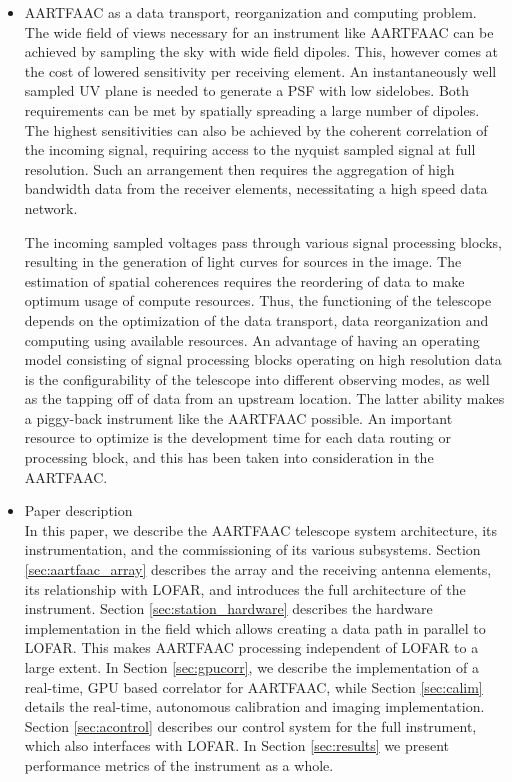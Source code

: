 \documentclass{ws-jai}
\begin{document}
\begin{itemize}
\item AARTFAAC as a data transport, reorganization and computing problem.\\
The  wide field  of  views necessary  for  an instrument  like  AARTFAAC can  be
achieved by sampling the sky with wide field dipoles. This, however comes at the
cost  of lowered  sensitivity per  receiving element.   An instantaneously  well
sampled  UV  plane  is  needed  to  generate a  PSF  with  low  sidelobes.  Both
requirements can be  met by spatially spreading a large  number of dipoles.  The
highest sensitivities  can also be achieved  by the coherent correlation  of the
incoming  signal,  requiring  access  to  the nyquist  sampled  signal  at  full
resolution. Such an arrangement then  requires the aggregation of high bandwidth
data from the receiver elements, necessitating a high speed data network.

The incoming  sampled voltages  pass through  various signal  processing blocks,
resulting  in the  generation of  light curves  for sources  in the  image.  The
estimation of spatial coherences requires the reordering of data to make optimum
usage of  compute resources. Thus, the  functioning of the telescope  depends on
the optimization of the data  transport, data reorganization and computing using
available resources.   An advantage of  having an operating model  consisting of
signal   processing  blocks   operating   on  high   resolution   data  is   the
configurability of the telescope into different  observing modes, as well as the
tapping  off of  data from  an upstream  location.  The  latter ability  makes a
piggy-back  instrument like  the  AARTFAAC possible.  An  important resource  to
optimize is the development time for  each data routing or processing block, and
this has been taken into consideration in the AARTFAAC.

\item Paper description \\
In  this paper,  we describe  the  AARTFAAC telescope  system architecture,  its
instrumentation,  and  the commissioning  of  its  various subsystems.   Section
\ref{sec:aartfaac_array} describes the array and the receiving antenna elements,
its  relationship  with LOFAR,  and  introduces  the  full architecture  of  the
instrument.    Section   \ref{sec:station_hardware}   describes   the   hardware
implementation in  the field which  allows creating a  data path in  parallel to
LOFAR. This  makes AARTFAAC processing independent  of LOFAR to a  large extent.
In Section \ref{sec:gpucorr}, we describe the implementation of a real-time, GPU
based  correlator  for  AARTFAAC,  while  Section  \ref{sec:calim}  details  the
real-time,   autonomous  calibration   and   imaging  implementation.    Section
\ref{sec:acontrol} describes our  control system for the  full instrument, which
also interfaces with LOFAR.  In Section \ref{sec:results} we present performance
metrics of the instrument as a whole.
\end{itemize}
\end{document}
